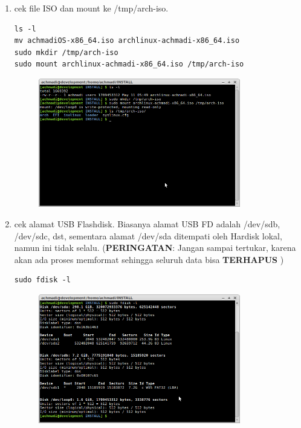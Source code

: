 \documentclass[12pt,]{article}
\begin{document}
	\begin{enumerate}
		\item cek file ISO dan mount ke /tmp/arch-iso.
		\begin{verbatim}
ls -l 
mv achmadiOS-x86_64.iso archlinux-achmadi-x86_64.iso
sudo mkdir /tmp/arch-iso 
sudo mount archlinux-achmadi-x86_64.iso /tmp/arch-iso
		\end{verbatim} 
		
		\begin{figure}[!ht]
			\centering
			\includegraphics[width=250pt]{usbubuntu/step_1}
		\end{figure} 
	
		\item cek alamat USB Flashdisk.
		Biasanya alamat USB FD adalah /dev/sdb, /dev/sdc, dst, sementara alamat /dev/sda ditempati oleh Hardisk lokal, namun ini tidak selalu.
		(\textbf{PERINGATAN}: Jangan sampai tertukar, karena akan ada proses memformat sehingga seluruh data bisa \textbf{TERHAPUS} )
		
		\begin{verbatim}
sudo fdisk -l
		\end{verbatim} 
		
		\newpage
		\begin{figure}[!ht]
			\centering
			\includegraphics[width=250pt]{usbubuntu/step_2}
		\end{figure}
	

\end{enumerate}
\end{document}
